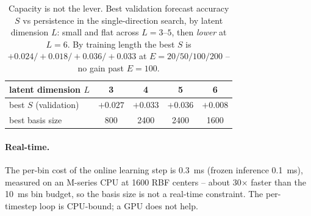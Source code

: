 \documentclass{article}
\begin{document}
\begin{table}[t]
  \centering
  \caption{Capacity is not the lever. Best validation forecast accuracy $S$ vs persistence in the
    single-direction search, by latent dimension $L$: small and flat across $L{=}3$--$5$, then
    \emph{lower} at $L{=}6$. By training length the best $S$ is $+0.024/+0.018/+0.036/+0.033$ at
    $E{=}20/50/100/200$ -- no gain past $E{=}100$.}
  \label{tab:capacity}
  \begin{tabular}{lcccc}
    \toprule
    latent dimension $L$ & 3 & 4 & 5 & 6 \\
    \midrule
    best $S$ (validation)   & $+0.027$ & $+0.033$ & $+0.036$ & $+0.008$ \\
    best basis size         & 800 & 2400 & 2400 & 1600 \\
    \bottomrule
  \end{tabular}
\end{table}

\paragraph{Real-time.}
The per-bin cost of the online learning step is \SI{0.3}{ms} (frozen inference \SI{0.1}{ms}),
measured on an M-series CPU at \num{1600} RBF centers -- about \num{30}$\times$ faster than the
\SI{10}{ms} bin budget, so the basis size is not a real-time constraint. The per-timestep loop
is CPU-bound; a GPU does not help.
\end{document}
